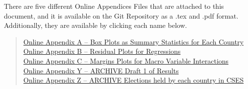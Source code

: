 \documentclass[12pt, titlepage]{article}
\begin{document}
\begin{appendices}
There are five different Online Appendices Files that are attached to this document, and it is available on the Git Repository as a .tex and .pdf format. Additionally, they are available by clicking each name below.

\begin{quote}
\href{https://drive.google.com/file/d/175fvnZSjtcPDN4PoS1wW_Iw-PWTRWVJk/view?usp=sharing}{Online Appendix A -- Box Plots as Summary Statistics for Each Country} \\
\href{https://drive.google.com/file/d/1rFyIFRxbDp8NFk02RaVUj-C6hNtOKx2u/view?usp=sharing}{Online Appendix B -- Residual Plots for Regressions} \\
\href{https://drive.google.com/file/d/15xRxKmMw7UeUlXWFSc1yJr_eGSFOcDjU/view?usp=sharing}{Online Appendix C -- Margins Plots for Macro Variable Interactions} \\
\href{https://drive.google.com/file/d/1OVcB038erJnrL_R9ExDKx5ryF-qSXKyp/view?usp=sharing}{Online Appendix Y -- ARCHIVE Draft 1 of Results}  \\
\href{https://drive.google.com/file/d/1byaS6KsEFQO-ZLMpMFtgMAwa7bZ1pzXR/view?usp=sharing}{Online Appendix Z -- ARCHIVE Elections held by each country in CSES} \\
\end{quote}

\clearpage

\end{appendices}


\clearpage


\end{document}
